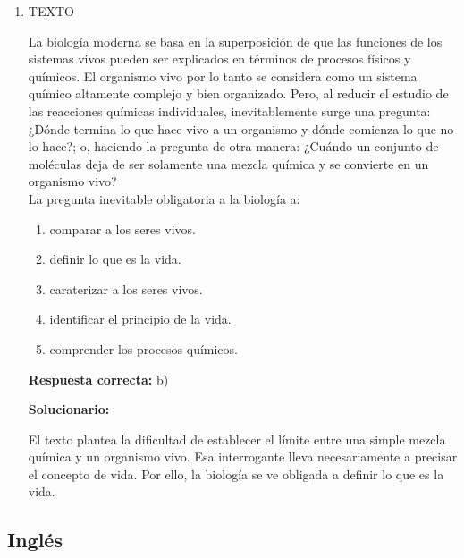 \begin{enumerate}[resume]
	
	\item \hfill TEXTO \hfill \null
	
	La biología moderna se basa en la superposición de que las funciones de los sistemas vivos pueden ser explicados en términos de procesos físicos y químicos. El organismo vivo por lo tanto se considera como un sistema químico altamente complejo y bien organizado. Pero, al reducir el estudio de las reacciones químicas individuales, inevitablemente surge una pregunta: ¿Dónde termina lo que hace vivo a un organismo y dónde comienza lo que no lo hace?; o, haciendo la pregunta de otra manera: ¿Cuándo un conjunto de moléculas deja de ser solamente una mezcla química y se convierte en un organismo vivo?\\
	La pregunta inevitable obligatoria a la biología a:
	
	\begin{enumerate}[label=\alph*)]
		\item comparar a los seres vivos.
		\item definir lo que es la vida.
		\item caraterizar a los seres vivos.
		\item identificar el principio de la vida.
		\item comprender los procesos químicos.
	\end{enumerate}
	
	\textbf{Respuesta correcta:} b)
	
	\vspace{2mm}
	\textbf{Solucionario:}
	
	El texto plantea la dificultad de establecer el límite entre una simple mezcla química y un organismo vivo. Esa interrogante lleva necesariamente a precisar el concepto de vida. Por ello, la biología se ve obligada a definir lo que es la vida.
	
\end{enumerate}


\subsection*{Inglés}

